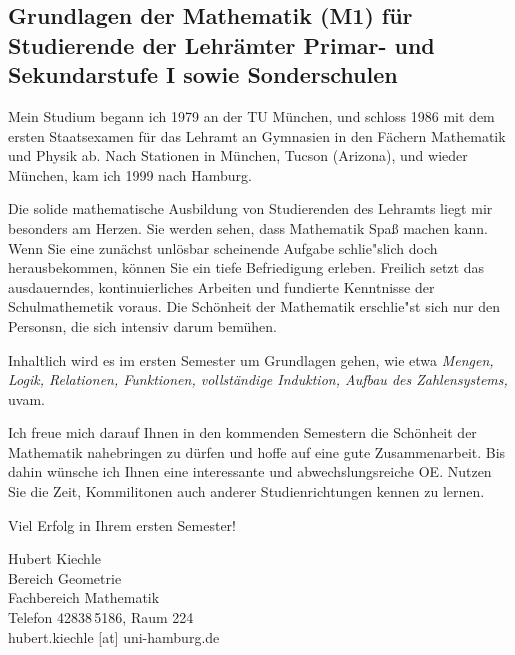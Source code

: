 \subsection{Grundlagen der Mathematik (M1) f\"ur Studierende der Lehr\"amter
Primar- und Sekundarstufe I sowie Sonderschulen} 

Mein Studium begann ich 1979 an der TU M\"unchen, und schloss 1986 mit dem
ersten Staatsexamen f\"ur das Lehramt an Gymnasien in den F\"achern Mathematik
und Physik ab. Nach Stationen in M\"unchen, Tucson (Arizona), und wieder
M\"unchen, kam ich 1999 nach Hamburg.

Die solide mathematische Ausbildung von Studierenden des Lehramts liegt mir
besonders am Herzen.  Sie werden sehen, dass Mathematik Spa\ss{} machen kann.
Wenn Sie eine zun\"achst unl\"osbar scheinende Aufgabe schlie"slich doch
herausbekommen, k\"onnen Sie ein tiefe Befriedigung erleben.  Freilich setzt
das ausdauerndes, kontinuierliches Arbeiten und fundierte Kenntnisse der
Schulmathemetik voraus. Die Sch\"onheit der Mathematik erschlie"st sich nur den
Personsn, die sich intensiv darum bem\"uhen.

Inhaltlich wird es im ersten Semester um Grundlagen gehen, wie etwa
\textit{Mengen, Logik, Relationen, Funktionen, vollst\"andige Induktion, Aufbau
des Zahlensystems,} uvam.

Ich freue mich darauf Ihnen in den kommenden Semestern die Sch\"onheit der
Mathematik nahebringen zu d\"urfen und hoffe auf eine gute Zusammenarbeit.  Bis
dahin w\"unsche ich Ihnen eine interessante und abwechslungsreiche OE. Nutzen
Sie die Zeit, Kommilitonen auch anderer Studienrichtungen kennen zu lernen.

Viel Erfolg in Ihrem ersten Semester!

Hubert Kiechle\\
Bereich Geometrie\\
Fachbereich Mathematik\\
Telefon 42838\,5186, Raum 224\\
hubert.kiechle [at] uni-hamburg.de
